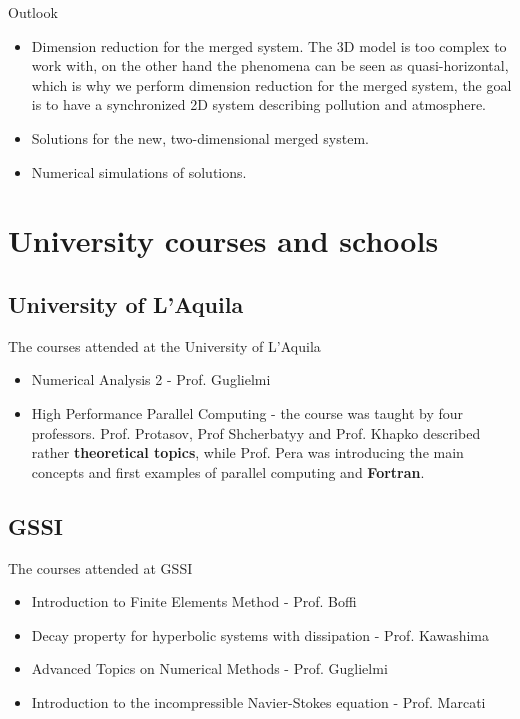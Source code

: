 \documentclass{beamer}
\begin{document}
\begin{frame}{Outlook}
  \begin{itemize}
  \item Dimension reduction for the merged system. The 3D model is too complex to work with, on the other hand the phenomena can be seen as quasi-horizontal, which is why we perform dimension reduction for the merged system, the goal is to have a synchronized 2D system describing pollution and atmosphere.
  \item Solutions for the new, two-dimensional merged system.
  \item Numerical simulations of solutions.
  \end{itemize}
\end{frame}


\section{University courses and schools}

\subsection{University of L'Aquila}

\begin{frame}{The courses attended at the University of L'Aquila}
  \begin{itemize}
  \item
    Numerical Analysis 2 - Prof. Guglielmi
  \item
    High Performance Parallel Computing - the course was taught by four professors. Prof. Protasov, Prof Shcherbatyy and Prof. Khapko described rather \textbf{theoretical topics}, while Prof. Pera was introducing the main concepts and first examples of parallel computing and \textbf{Fortran}.
  \end{itemize}
\end{frame}

\subsection{GSSI}

\begin{frame}{The courses attended at GSSI}

  \begin{itemize}
  \item
    Introduction to Finite Elements Method - Prof. Boffi
  \item
    Decay property for hyperbolic systems with dissipation - Prof. Kawashima
  \item
    Advanced Topics on Numerical Methods - Prof. Guglielmi
  \item
    Introduction to the incompressible Navier-Stokes equation - Prof. Marcati  
  \end{itemize}
\end{frame}
\end{document}
